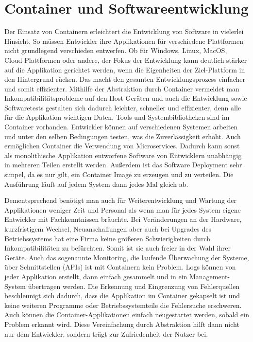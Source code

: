 \section{Container und Softwareentwicklung} 
\label{sec:Softwareentwicklung}
Der Einsatz von Containern erleichtert die Entwicklung von Software in vielerlei Hinsicht.
So müssen Entwickler ihre Applikationen für verschiedene Plattformen nicht grundlegend verschieden entwerfen.
Ob für Windows, Linux, MacOS, Cloud-Plattformen oder andere, der Fokus der Entwicklung kann deutlich stärker auf die Applikation gerichtet werden, wenn die Eigenheiten der Ziel-Plattform in den Hintergrund rücken. 
Das macht den gesamten Entwicklungsprozess einfacher und somit effizienter.
Mithilfe der Abstraktion durch Container vermeidet man Inkompatibilitätsprobleme auf den Host-Geräten und auch die Entwicklung sowie Softwaretests gestalten sich dadurch leichter, schneller und effizienter, denn alle für die Applikation wichtigen Daten, Tools und Systembibliotheken sind im Container vorhanden.
Entwickler können auf verschiedenen Systemen arbeiten und unter den selben Bedingungen testen, was die Zuverlässigkeit erhöht. 
Auch ermöglichen Container die Verwendung von Microservices.
Dadurch kann sonst als monolithische Applikation entworfene Software von Entwicklern unabhängig in mehreren Teilen erstellt werden.
Außerdem ist das Software Deployment sehr simpel, da es nur gilt, ein Container Image zu erzeugen und zu verteilen.
Die Ausführung läuft auf jedem System dann jedes Mal gleich ab.

Dementsprechend benötigt man auch für Weiterentwicklung und Wartung der Applikationen weniger Zeit und Personal als wenn man für jedes System eigene Entwickler mit Fachkenntnissen bräuchte.
Bei Veränderungen an der Hardware, kurzfristigem Wechsel, Neuanschaffungen aber auch bei Upgrades des Betriebssystems hat eine Firma keine größeren Schwierigkeiten durch Inkompatibilitäten zu befürchten. Somit ist sie auch freier in der Wahl ihrer Geräte.
Auch das sogenannte Monitoring, die laufende Überwachung der Systeme, über Schnittstellen (APIs) ist mit Containern kein Problem.
Logs können von jeder Applikation erstellt, dann einfach gesammelt und in ein Management-System übertragen werden.
Die Erkennung und Eingrenzung von Fehlerquellen beschleunigt sich dadurch, dass die Applikation im Container gekapselt ist und keine weiteren Programme oder Betriebssystemteile die Fehlersuche erschweren.
Auch können die Container-Applikationen einfach neugestartet werden, sobald ein Problem erkannt wird.
Diese Vereinfachung durch Abstraktion hilft dann nicht nur dem Entwickler, sondern trägt zur Zufriedenheit der Nutzer bei. 

